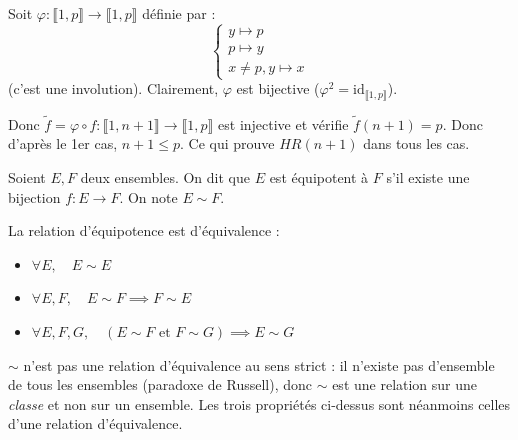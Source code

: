 \documentclass[a4paper,11pt]{article}
\begin{document}
\begin{demonstration}
\begin{center}
\end{center}

Soit $\varphi : \llbracket 1, p \rrbracket \to \llbracket 1, p \rrbracket$ définie par :
\[
\begin{cases}
y \mapsto p \\
p \mapsto y \\
x \neq p, y \mapsto x
\end{cases}
\]
(c'est une involution).
Clairement, $\varphi$ est bijective ($\varphi^2 = \text{id}_{\llbracket 1, p \rrbracket}$).

Donc $\tilde{f} = \varphi \circ f : \llbracket 1, n+1 \rrbracket \to \llbracket 1, p \rrbracket$ est injective et vérifie $\tilde{f}(n+1) = p$.
Donc d'après le 1er cas, $n+1 \le p$.
Ce qui prouve $HR(n+1)$ dans tous les cas.
\end{demonstration}

\begin{definition}
Soient $E, F$ deux ensembles. On dit que $E$ est équipotent à $F$ s'il existe une bijection $f : E \to F$. On note $E \sim F$.
\end{definition}

\begin{proposition}
La relation d'équipotence est d'équivalence :
\begin{itemize}
    \item $\forall E, \quad E \sim E$
    \item $\forall E, F, \quad E \sim F \implies F \sim E$
    \item $\forall E, F, G, \quad (E \sim F \text{ et } F \sim G) \implies E \sim G$
\end{itemize}
\end{proposition}

\begin{remarque}
$\sim$ n'est pas une relation d'équivalence au sens strict : il n'existe pas d'ensemble de
tous les ensembles (paradoxe de Russell), donc $\sim$ est une relation sur une
\emph{classe} et non sur un ensemble. Les trois propriétés ci-dessus sont néanmoins celles
d'une relation d'équivalence.
\end{remarque}
\end{document}
